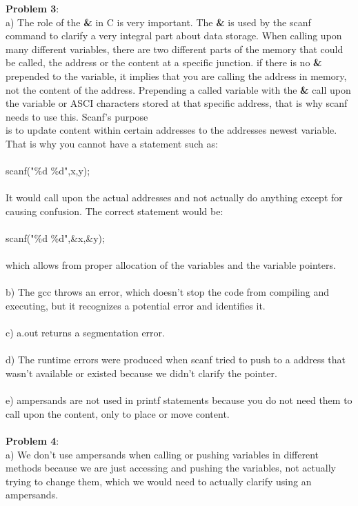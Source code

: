 \documentclass[12pt]{article}
\newcommand{\tab}[0]{\indent \indent}
\newcommand{\enter}[0]{\\ \tab}
\begin{document}
\textbf{Problem 3}: \\ \tab a) The role of the \textbf{\&} in C is very important. The \textbf{\&} is used by the scanf command         \tab  to clarify a very integral part about data storage. When calling upon many different \tab variables, there are two different parts of the memory that could be called, the address \tab or the content at a specific junction. if there is no \textbf{\&} prepended to the variable, it \tab implies that you are calling the address in memory, not the content of the address. \tab Prepending a called variable with the \textbf{\&} call upon the variable or ASCI characters \tab stored at that specific address, that is why scanf needs to use this. Scanf's purpose \\ \tab is to update content within certain addresses to the addresses newest variable. That \tab is why you cannot have a statement such as: \\ \enter \tab scanf("\%d \%d",x,y); \\ \enter It would call upon the actual addresses and not actually do anything except for \enter causing confusion. The correct statement would be:  \\ \enter \tab scanf("\%d \%d",\&x,\&y); \\ \enter which allows from proper allocation of the variables and the variable pointers.\\\\
\tab b) The gcc throws an error, which doesn't stop the code from compiling and \enter executing, but it recognizes a potential error and identifies it. \\\\
\tab c) a.out returns a segmentation error. \\\\
\tab d) The runtime errors were produced when scanf tried to push to a address that \tab wasn't available or existed because we didn't clarify the pointer. \\\\
\tab e) ampersands are not used in printf statements because you do not need them to call \tab upon the content, only to place or move content. \\\\
\indent  \textbf{Problem 4}: \\ \tab a) We don't use ampersands when calling or pushing variables in different methods \tab because we are just accessing and pushing the variables, not actually trying to change \tab them, which we would need to actually clarify using an ampersands. \\\\
\end{document}
